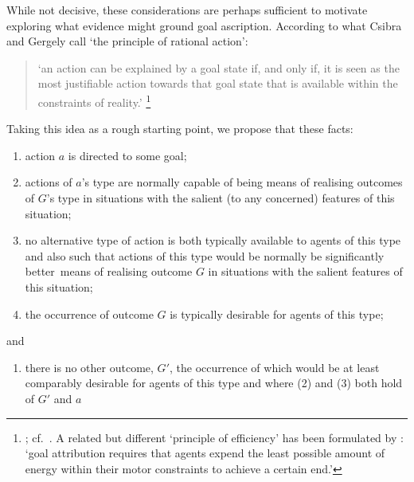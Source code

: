 \documentclass[14pt,a4paper]{extarticle}
\begin{document}
While not decisive,
these considerations are perhaps sufficient to motivate 
exploring what evidence might ground goal ascription.
According to 
what Csibra and Gergely call `the principle of rational action':
%
\begin{quote}
`an action can be explained by a goal state if, and only if, it is seen as the most justifiable action towards that goal state that is available within the constraints of reality.'%
\footnote{
\citet[p.\ 255]{Csibra:1998cx}; cf.\ \citet{Csibra:2003jv}.
A related but different `principle of efficiency' has been formulated by \citet[p.\ 1061]{Southgate:2008el}:
`goal attribution requires that agents expend the least possible amount of energy within their motor constraints to achieve a certain end.'
}
\end{quote}
%
Taking this idea as a rough starting point,
we propose that
these facts:
%
\begin{enumerate}
%
\item action $a$ is directed to some goal;
%
\item actions of $a$'s type are normally capable of being means of realising outcomes of $G$'s type in situations with the salient (to any concerned) features of this situation;
% 
\item no alternative type of action is both 
typically available to agents of this type 
and also 
such that actions of this type would be normally be significantly better\footnotemark \ means of realising outcome $G$ in situations with the salient features of this situation;
%
\item the occurrence of outcome $G$ is typically desirable for agents of this type;
%
\end{enumerate}
%
and
%
\begin{enumerate}[resume]
\item there is no other outcome, $G'$, 
the occurrence of which would be at least comparably desirable for agents of this type 
and where (2) and (3) both hold of $G'$ and $a$
%
\end{enumerate}
\end{document}
